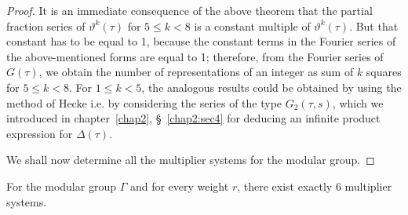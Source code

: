 \begin{proof}
It is an immediate consequence of the above theorem that the partial
fraction series of $\vartheta^k(\tau)$ for $5\leq k<8$ is a constant
multiple of $\vartheta^k(\tau)$. But that constant has to be equal to
1, because the constant terms in the Fourier series of the
above-mentioned forms are equal to 1; therefore, from the Fourier
series of $G(\tau)$, we obtain the number of representations of an
integer as sum of $k$ squares for $5\leq k <8$. For $1 \leq k <5$, the
analogous results could be obtained by using the method of Hecke
i.e. by considering the series of the type $G_2(\tau,s)$, which we
introduced in chapter~\ref{chap2}, \S~\ref{chap2:sec4} for deducing an infinite product
expression for $\Delta(\tau)$. 

We \pageoriginale shall now determine all the multiplier systems for
the modular group.
\end{proof}

\begin{thm}\label{chap3:thm19}
For the modular group $\Gamma$ and for every weight $r$, there exist
exactly 6 multiplier systems.
\end{thm}

